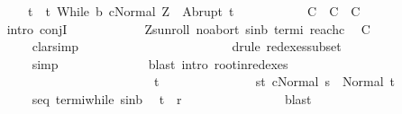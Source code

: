 \begin{isabellebody}
\ \ \ \ \ \ \ \ \ \ \ \ \ t\ {\isasymin}\ {\isacharbraceleft}t{\isachardot}\ {\isasymGamma}{\isasymturnstile}{\isasymlangle}While\ b\ c{\isacharcomma}Normal\ Z{\isasymrangle}\ {\isasymRightarrow}\ Abrupt\ t{\isacharbraceright}{\isacharparenright}{\isachardoublequoteclose}\isanewline
\ \ \ \ \ \ \ \ \ \ {\isacharparenleft}\ {\isachardoublequoteopen}{\isacharquery}C{}\ {\isasymand}\ {\isacharquery}C{}\ {\isasymand}\ {\isacharquery}C{}{\isachardoublequoteclose}{\isacharparenright}\isanewline
\ \ \ \ \ \ \ \ \isamarkupfalse%
\ {\isacharparenleft}intro\ conjI{\isacharparenright}\isanewline
\ \ \ \ \ \ \ \ \ \ \isamarkupfalse%
\ Z{\isacharunderscore}s{\isacharunderscore}unroll\ noabort\ s{\isacharunderscore}in{\isacharunderscore}b\ termi\ reach{\isacharunderscore}c\ \isamarkupfalse%
\ {\isacharquery}C{}\ \isanewline
\ \ \ \ \ \ \ \ \ \ \ \ \isamarkupfalse%
\ clarsimp\ \ \ \ \ \ \ \ \ \ \isanewline
\ \ \ \ \ \ \ \ \ \ \ \ \isamarkupfalse%
\ {\isacharparenleft}drule\ redexes{\isacharunderscore}subset{\isacharparenright}\isanewline
\ \ \ \ \ \ \ \ \ \ \ \ \isamarkupfalse%
\ simp\isanewline
\ \ \ \ \ \ \ \ \ \ \ \ \isamarkupfalse%
\ {\isacharparenleft}blast\ intro{\isacharcolon}\ root{\isacharunderscore}in{\isacharunderscore}redexes{\isacharparenright}\isanewline
\ \ \ \ \ \ \ \ \ \ \ \ \isamarkupfalse%
\isanewline
\ \ \ \ \ \ \ \ \isamarkupfalse%
\isanewline
\ \ \ \ \ \ \ \ \ \ \isacommand{{\isacharbraceleft}}\isamarkupfalse%
\isanewline
\ \ \ \ \ \ \ \ \ \ \ \ \isamarkupfalse%
\ t\ \isanewline
\ \ \ \ \ \ \ \ \ \ \ \ \isamarkupfalse%
\ s{\isacharunderscore}t{\isacharcolon}\ {\isachardoublequoteopen}{\isasymGamma}{\isasymturnstile}{\isasymlangle}c{\isacharcomma}Normal\ s{\isasymrangle}\ {\isasymRightarrow}\ Normal\ t{\isachardoublequoteclose}\isanewline
\ \ \ \ \ \ \ \ \ \ \ \ \isamarkupfalse%
\ s{\isacharunderscore}eq{\isacharunderscore}{\isasymtau}\ termi{\isacharunderscore}while\ s{\isacharunderscore}in{\isacharunderscore}b\ \isamarkupfalse%
\ {\isachardoublequoteopen}{\isacharparenleft}t{\isacharcomma}{\isasymtau}{\isacharparenright}\ {\isasymin}\ {\isacharquery}r{\isachardoublequoteclose}\isanewline
\ \ \ \ \ \ \ \ \ \ \ \ \ \ \isamarkupfalse%
\ blast\isanewline
\ \ \ \ \ \ \ \ \ \ \ \ \isamarkupfalse%
\isanewline
\ \ \ \ \ \ \ \ \ \ \ \ \isamarkupfalse%

\end{isabellebody}
